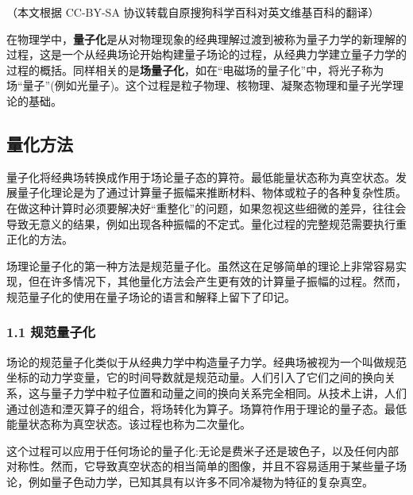 
（本文根据 CC-BY-SA 协议转载自原搜狗科学百科对英文维基百科的翻译）

在物理学中，\textbf{量子化}是从对物理现象的经典理解过渡到被称为量子力学的新理解的过程，这是一个从经典场论开始构建量子场论的过程，从经典力学建立量子力学的过程的概括。同样相关的是\textbf{场量子化}，如在“电磁场的量子化”中，将光子称为场“量子”(例如光量子)。这个过程是粒子物理、核物理、凝聚态物理和量子光学理论的基础。

\subsection{量化方法}
量子化将经典场转换成作用于场论量子态的算符。最低能量状态称为真空状态。发展量子化理论是为了通过计算量子振幅来推断材料、物体或粒子的各种复杂性质。在做这种计算时必须要解决好“重整化”的问题，如果忽视这些细微的差异，往往会导致无意义的结果，例如出现各种振幅的不定式。量化过程的完整规范需要执行重正化的方法。

场理论量子化的第一种方法是规范量子化。虽然这在足够简单的理论上非常容易实现，但在许多情况下，其他量化方法会产生更有效的计算量子振幅的过程。然而，规范量子化的使用在量子场论的语言和解释上留下了印记。

\subsubsection{1.1 规范量子化}
场论的规范量子化类似于从经典力学中构造量子力学。经典场被视为一个叫做规范坐标的动力学变量，它的时间导数就是规范动量。人们引入了它们之间的换向关系，这与量子力学中粒子位置和动量之间的换向关系完全相同。从技术上讲，人们通过创造和湮灭算子的组合，将场转化为算子。场算符作用于理论的量子态。最低能量状态称为真空状态。该过程也称为二次量化。

这个过程可以应用于任何场论的量子化:无论是费米子还是玻色子，以及任何内部对称性。然而，它导致真空状态的相当简单的图像，并且不容易适用于某些量子场论，例如量子色动力学，已知其具有以许多不同冷凝物为特征的复杂真空。










